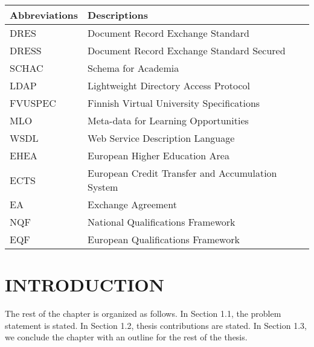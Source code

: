 \documentclass[12pt,a4paper,oneside]{book} %
\begin{document}
\begin{table}[h]
    \renewcommand{\arraystretch}{1.3}
    \label{table:table1}
     \begin{tabular}{ll}
        \hline\hline
            {\bfseries Abbreviations} & {\bfseries Descriptions} \\
            \hline                                      %
            DRES & Document Record Exchange Standard  \\
            DRESS & Document Record Exchange Standard Secured  \\
            SCHAC & Schema for Academia  \\
            LDAP & Lightweight Directory Access Protocol \\
            FVUSPEC & Finnish Virtual University Specifications  \\
            MLO & Meta-data for Learning Opportunities  \\
            WSDL & Web Service Description Language  \\
            EHEA & European Higher Education Area  \\
            ECTS & European Credit Transfer and Accumulation System  \\
            EA & Exchange Agreement  \\
            NQF & National Qualifications Framework  \\
            EQF & European Qualifications Framework  \\
            \hline                          %
    \end{tabular}
\end{table}

\listoffigures
\listoftables

%
\resetpagenumbering

\chapter{INTRODUCTION}\label{c-intro}

The rest of the chapter is organized as follows. In Section 1.1, the problem statement is stated. In Section 1.2, thesis contributions are stated. In Section 1.3, we conclude the chapter with an outline for the rest of the thesis.
\end{document}
